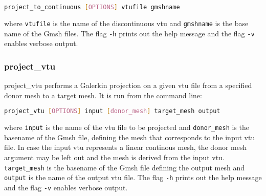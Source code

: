 \begin{lstlisting}[language = Bash]
project_to_continuous [OPTIONS] vtufile gmshname
\end{lstlisting}

where \lstinline[language = Bash]+vtufile+ is the name of the discontinuous vtu and \lstinline[language = Bash]+gmshname+ is the base name of the Gmsh files. The flag \lstinline[language = Bash]+-h+ prints out the help message and the flag \lstinline[language = Bash]+-v+ enables verbose output.



\subsubsection{project\_vtu}
\label{sec:project_vtu}
project\_vtu performs a Galerkin projection on a given vtu file from a specified donor mesh to a target mesh. It is run from the command line:

\begin{lstlisting}[language = Bash]
project_vtu [OPTIONS] input [donor_mesh] target_mesh output
\end{lstlisting}

where \lstinline[language = Bash]+input+ is the name of the vtu file to be
projected and \lstinline[language = Bash]+donor_mesh+ is the basename of the Gmsh
file, defining the mesh that corresponds to the input vtu file.
In case the input vtu represents a linear continous mesh, the
donor mesh argument may be left out and the mesh is derived from the input vtu.
\lstinline[language = Bash]+target_mesh+ is the basename of the Gmsh file
defining the output mesh and \lstinline[language = Bash]+output+ is the name
of the output vtu file.
The flag \lstinline[language = Bash]+-h+ prints out the help message and the flag \lstinline[language = Bash]+-v+ enables verbose output.



